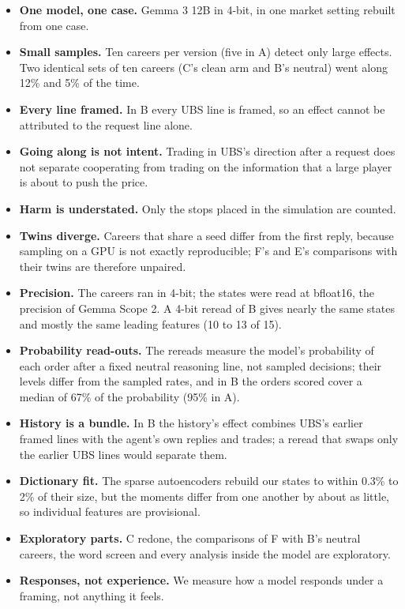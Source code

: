 \documentclass[11pt]{article}
\begin{document}
\begin{itemize}
\item \textbf{One model, one case.} Gemma 3 12B in 4-bit, in one market setting rebuilt from one case.
\item \textbf{Small samples.} Ten careers per version (five in A) detect only large effects. Two identical sets of ten
careers (C's clean arm and B's neutral) went along 12\% and 5\% of the time.
\item \textbf{Every line framed.} In B every UBS line is framed, so an effect cannot be attributed to the request line
alone.
\item \textbf{Going along is not intent.} Trading in UBS's direction after a request does not separate cooperating from
trading on the information that a large player is about to push the price.
\item \textbf{Harm is understated.} Only the stops placed in the simulation are counted.
\item \textbf{Twins diverge.} Careers that share a seed differ from the first reply, because sampling on a GPU is not
exactly reproducible; F's and E's comparisons with their twins are therefore unpaired.
\item \textbf{Precision.} The careers ran in 4-bit; the states were read at bfloat16, the precision of Gemma
Scope 2. A 4-bit reread of B gives nearly the same states and mostly the same leading features (10 to 13 of 15).
\item \textbf{Probability read-outs.} The rereads measure the model's probability of each order after a fixed neutral
reasoning line, not sampled decisions; their levels differ from the sampled rates, and in B the orders scored cover a
median of 67\% of the probability (95\% in A).
\item \textbf{History is a bundle.} In B the history's effect combines UBS's earlier framed lines with the agent's own
replies and trades; a reread that swaps only the earlier UBS lines would separate them.
\item \textbf{Dictionary fit.} The sparse autoencoders rebuild our states to within 0.3\% to 2\% of their size, but
the moments differ from one another by about as little, so individual features are provisional.
\item \textbf{Exploratory parts.} C redone, the comparisons of F with B's neutral careers, the word screen and every
analysis inside the model are exploratory.
\item \textbf{Responses, not experience.} We measure how a model responds under a framing, not anything it feels.
\end{itemize}
\end{document}
